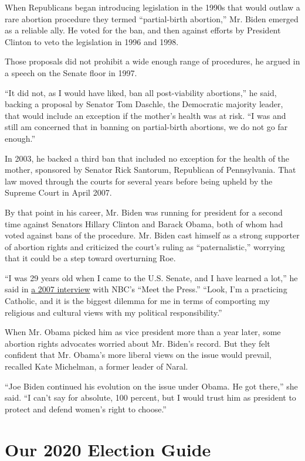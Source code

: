 When Republicans began introducing legislation in the 1990s that would
outlaw a rare abortion procedure they termed ``partial-birth abortion,''
Mr. Biden emerged as a reliable ally. He voted for the ban, and then
against efforts by President Clinton to veto the legislation in 1996 and
1998.

Those proposals did not prohibit a wide enough range of procedures, he
argued in a speech on the Senate floor in 1997.

``It did not, as I would have liked, ban all post-viability abortions,''
he said, backing a proposal by Senator Tom Daschle, the Democratic
majority leader, that would include an exception if the mother's health
was at risk. ``I was and still am concerned that in banning on
partial-birth abortions, we do not go far enough.''

In 2003, he backed a third ban that included no exception for the health
of the mother, sponsored by Senator Rick Santorum, Republican of
Pennsylvania. That law moved through the courts for several years before
being upheld by the Supreme Court in April 2007.

By that point in his career, Mr. Biden was running for president for a
second time against Senators Hillary Clinton and Barack Obama, both of
whom had voted against bans of the procedure. Mr. Biden cast himself as
a strong supporter of abortion rights and criticized the court's ruling
as ``paternalistic,'' worrying that it could be a step toward
overturning Roe.

``I was 29 years old when I came to the U.S. Senate, and I have learned
a lot,'' he said in
\href{http://www.nbcnews.com/id/18381961/ns/meet_the_press/t/mtp-transcript-april/\#.XJKTZRNKjfY}{a
2007 interview} with NBC's ``Meet the Press.'' ``Look, I'm a practicing
Catholic, and it is the biggest dilemma for me in terms of comporting my
religious and cultural views with my political responsibility.''

When Mr. Obama picked him as vice president more than a year later, some
abortion rights advocates worried about Mr. Biden's record. But they
felt confident that Mr. Obama's more liberal views on the issue would
prevail, recalled Kate Michelman, a former leader of Naral.

``Joe Biden continued his evolution on the issue under Obama. He got
there,'' she said. ``I can't say for absolute, 100 percent, but I would
trust him as president to protect and defend women's right to choose.''

\hypertarget{our-2020-election-guide}{%
\section{Our 2020 Election Guide}\label{our-2020-election-guide}}

